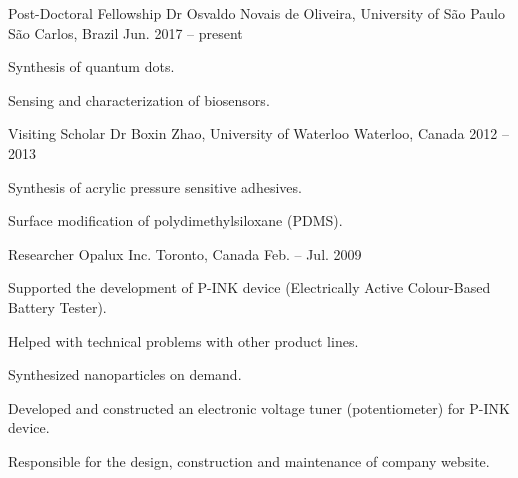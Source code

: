 

\begin{cventries}

  \cventry
    {Post-Doctoral Fellowship}
    {Dr Osvaldo Novais de Oliveira, University of São Paulo}
    {São Carlos, Brazil}
    {Jun. 2017 -- present}
    {
      \begin{cvitems}
        \item {Synthesis of quantum dots.}
        \item {Sensing and characterization of biosensors.}
      \end{cvitems}
    }

  \cventry
    {Visiting Scholar}
    {Dr Boxin Zhao, University of Waterloo}
    {Waterloo, Canada}
    {2012 -- 2013}
    {
      \begin{cvitems}
        \item {Synthesis of acrylic pressure sensitive adhesives.}
        \item {Surface modification of polydimethylsiloxane (PDMS).}
      \end{cvitems}
    }

  \cventry
  {Researcher}
  {Opalux Inc.}
  {Toronto, Canada}
  {Feb. -- Jul. 2009}
  {
    \begin{cvitems}
      \item {Supported the development of P-INK device (Electrically Active Colour-Based Battery Tester).}
      \item {Helped with technical problems with other product lines.}
      \item {Synthesized nanoparticles on demand.}
      \item {Developed and constructed an electronic voltage tuner (potentiometer) for P-INK device.}
      \item {Responsible for the design, construction and maintenance of company website.}
    \end{cvitems}
  }


\end{cventries}
